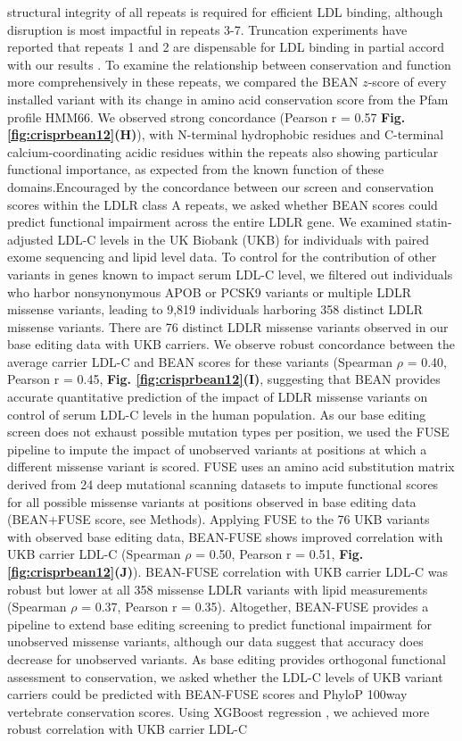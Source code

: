 \documentclass[a4paper, titlepage, openright]{book}
\begin{document}
structural integrity of all repeats is required for efficient LDL binding, although disruption is most impactful in repeats 3-7. Truncation experiments have reported that repeats 1 and 2 are dispensable for LDL binding \citep{russell1989different} in partial accord with our results \citep{jeon2005structure}. To examine the relationship between conservation and function more comprehensively in these repeats, we compared the BEAN $z$-score of every installed variant with its change in amino acid conservation score from the Pfam profile HMM66. We observed strong concordance (Pearson r = 0.57 \textbf{Fig. \ref{fig:crisprbean12}(H)}), with N-terminal hydrophobic residues and C-terminal calcium-coordinating acidic residues within the repeats also showing particular functional importance, as expected from the known function of these domains.Encouraged by the concordance between our screen and conservation scores within the LDLR class A repeats, we asked whether BEAN scores could predict functional impairment across the entire LDLR gene. We examined statin-adjusted LDL-C levels \citep{global2013discovery} in the UK Biobank (UKB) for individuals with paired exome sequencing and lipid level data. To control for the contribution of other variants in genes known to impact serum LDL-C level, we filtered out individuals who harbor nonsynonymous APOB or PCSK9 variants or multiple LDLR missense variants, leading to 9,819 individuals harboring 358 distinct LDLR missense variants. There are 76 distinct LDLR missense variants observed in our base editing data with UKB carriers. We observe robust concordance between the average carrier LDL-C and BEAN scores for these variants (Spearman $\rho$ = 0.40, Pearson r = 0.45, \textbf{Fig. \ref{fig:crisprbean12}(I)}, suggesting that BEAN provides accurate quantitative prediction of the impact of LDLR missense variants on control of serum LDL-C levels in the human population. As our base editing screen does not exhaust possible mutation types per position, we used the FUSE \citep{yu2023joint} pipeline to impute the impact of unobserved variants at positions at which a different missense variant is scored. FUSE uses an amino acid substitution matrix derived from 24 deep mutational scanning datasets to impute functional scores for all possible missense variants at positions observed in base editing data (BEAN+FUSE score, see Methods). Applying FUSE to the 76 UKB variants with observed base editing data, BEAN-FUSE shows improved correlation with UKB carrier LDL-C (Spearman $\rho$ = 0.50, Pearson r = 0.51, \textbf{Fig. \ref{fig:crisprbean12}(J)}). BEAN-FUSE correlation with UKB carrier LDL-C was robust but lower at all 358 missense LDLR variants with lipid measurements (Spearman $\rho$ = 0.37, Pearson r = 0.35). Altogether, BEAN-FUSE provides a pipeline to extend base editing screening to predict functional impairment for unobserved missense variants, although our data suggest that accuracy does decrease for unobserved variants. As base editing provides orthogonal functional assessment to conservation, we asked whether the LDL-C levels of UKB variant carriers could be predicted with BEAN-FUSE scores and PhyloP 100way vertebrate conservation scores. Using XGBoost regression \citep{chen2016xgboost}, we achieved more robust correlation with UKB carrier LDL-C 
\end{document}
